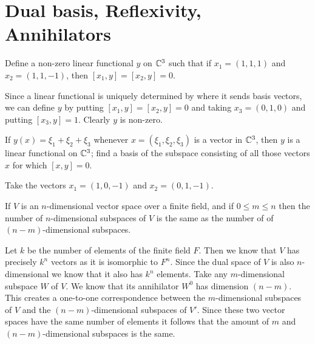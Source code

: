\section{Dual basis, Reflexivity, Annihilators}

\begin{problem}
  Define a non-zero linear functional $y$ on $\mathbb{C}^3$ such that if $x_1 = (1, 1, 1)$ and $x_2 = (1, 1, -1)$, then $[x_1, y] = [x_2, y] = 0$.
\end{problem}

\begin{solution}
  Since a linear functional is uniquely determined by where it sends basis vectors, we can define $y$ by putting $[x_1, y] = [x_2, y] = 0$ and taking $x_3 = (0, 1, 0)$ and putting $[x_3, y] = 1$.
  Clearly $y$ is non-zero.
\end{solution}

\setcounter{problem}{3}
\begin{problem}
  If $y(x) = \xi_1 + \xi_2 + \xi_3$ whenever $x = (\xi_1, \xi_2, \xi_3)$ is a vector in $\mathbb{C}^3$, then $y$ is a linear functional on $\mathbb{C}^3$;
  find a basis of the subspace consisting of all those vectors $x$ for which $[x, y] = 0$.
\end{problem}

\begin{solution}
  Take the vectors $x_1 = (1, 0, -1)$ and $x_2 = (0, 1, -1)$.
\end{solution}

\setcounter{problem}{6}
\begin{problem}
  If $V$ is an $n$-dimensional vector space over a finite field, and if $0 \le m \le n$ then the number of $n$-dimensional subspaces of $V$ is the same as the number of of $(n - m)$-dimensional subspaces.
\end{problem}

\begin{solution}
  Let $k$ be the number of elements of the finite field $F$.
  Then we know that $V$ has precisely $k^n$ vectors as it is isomorphic to $F^n$.
  Since the dual space of $V$ is also $n$-dimensional we know that it also has $k^n$ elements.
  Take any $m$-dimensional subspace $W$ of $V$.
  We know that its annihilator $W^0$ has dimension $(n - m)$.
  This creates a one-to-one correspondence between the $m$-dimensional subspaces of $V$ and the $(n - m)$-dimensional subspaces of $V'$.
  Since these two vector spaces have the same number of elements it follows that the amount of $m$ and $(n - m)$-dimensional subspaces is the same.
\end{solution}
